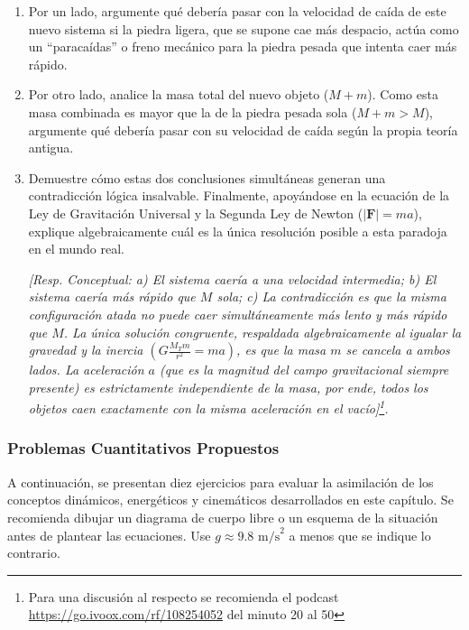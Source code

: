 \documentclass[11pt,a4paper]{book}
\begin{document}
    \begin{enumerate}
        \item[a)] Por un lado, argumente qué debería pasar con la velocidad de caída de este nuevo sistema si la piedra ligera, que se supone cae más despacio, actúa como un ``paracaídas'' o freno mecánico para la piedra pesada que intenta caer más rápido.
        \item[b)] Por otro lado, analice la masa total del nuevo objeto ($M + m$). Como esta masa combinada es mayor que la de la piedra pesada sola ($M+m > M$), argumente qué debería pasar con su velocidad de caída según la propia teoría antigua.
        \item[c)] Demuestre cómo estas dos conclusiones simultáneas generan una contradicción lógica insalvable. Finalmente, apoyándose en la ecuación de la Ley de Gravitación Universal y la Segunda Ley de Newton ($|\boldsymbol{F}| = ma$), explique algebraicamente cuál es la única resolución posible a esta paradoja en el mundo real. 
        
        \textit{[Resp. Conceptual: a) El sistema caería a una velocidad intermedia; b) El sistema caería más rápido que $M$ sola; c) La contradicción es que la misma configuración atada no puede caer simultáneamente más lento y más rápido que $M$. La única solución congruente, respaldada algebraicamente al igualar la gravedad y la inercia $\left(G\frac{M_T m}{r^2} = ma\right)$, es que la masa $m$ se cancela a ambos lados. La aceleración $a$ (que es la magnitud del campo gravitacional siempre presente) es estrictamente independiente de la masa, por ende, todos los objetos caen exactamente con la misma aceleración en el vacío]\footnote{Para una discusión al respecto se recomienda el podcast \url{ https://go.ivoox.com/rf/108254052} del minuto 20 al 50}.}
    \end{enumerate}


\subsubsection{Problemas Cuantitativos Propuestos}

A continuación, se presentan diez ejercicios para evaluar la asimilación de los conceptos dinámicos, energéticos y cinemáticos desarrollados en este capítulo. Se recomienda dibujar un diagrama de cuerpo libre o un esquema de la situación antes de plantear las ecuaciones. Use $g \approx 9.8 \text{ m/s}^2$ a menos que se indique lo contrario.
\end{document}

